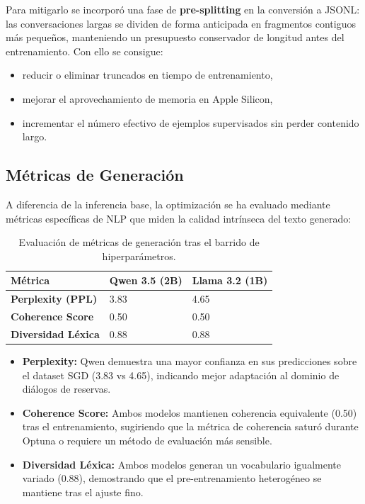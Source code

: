 Para mitigarlo se incorporó una fase de \textbf{pre-splitting} en la conversión a JSONL: las conversaciones largas se dividen de forma anticipada en fragmentos contiguos más pequeños, manteniendo un presupuesto conservador de longitud antes del entrenamiento. Con ello se consigue:
\begin{itemize}
    \item reducir o eliminar truncados en tiempo de entrenamiento,
    \item mejorar el aprovechamiento de memoria en Apple Silicon,
    \item incrementar el número efectivo de ejemplos supervisados sin perder contenido largo.
\end{itemize}

\subsection{Métricas de Generación}

A diferencia de la inferencia base, la optimización se ha evaluado mediante métricas específicas de NLP que miden la calidad intrínseca del texto generado:

\begin{table}[H]
    \centering
    \begin{tabularx}{\textwidth}{|l|X|X|}
        \hline
        \textbf{Métrica}          & \textbf{Qwen 3.5 (2B)}  & \textbf{Llama 3.2 (1B)}    \\ \hline
        \textbf{Perplexity (PPL)}  & 3.83                    & 4.65                          \\ \hline
        \textbf{Coherence Score}   & 0.50                    & 0.50                          \\ \hline
        \textbf{Diversidad Léxica}& 0.88                    & 0.88                          \\ \hline
    \end{tabularx}
    \caption{Evaluación de métricas de generación tras el barrido de hiperparámetros.}
    \label{tab:metricas_generacion}
\end{table}

\begin{itemize}
    \item \textbf{Perplexity:} Qwen demuestra una mayor confianza en sus predicciones sobre el dataset SGD (3.83 vs 4.65), indicando mejor adaptación al dominio de diálogos de reservas.
    \item \textbf{Coherence Score:} Ambos modelos mantienen coherencia equivalente (0.50) tras el entrenamiento, sugiriendo que la métrica de coherencia saturó durante Optuna o requiere un método de evaluación más sensible.
    \item \textbf{Diversidad Léxica:} Ambos modelos generan un vocabulario igualmente variado (0.88), demostrando que el pre-entrenamiento heterogéneo se mantiene tras el ajuste fino.
\end{itemize}

